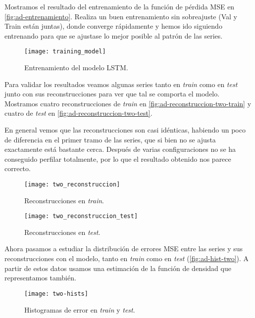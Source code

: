 Mostramos el resultado del entrenamiento de la función de pérdida MSE en \autoref{fig:ad-entrenamiento}. Realiza un buen entrenamiento sin sobreajuste (Val y Train están juntas), donde converge rápidamente y hemos ido siguiendo entrenando para que se ajustase lo mejor posible al patrón de las series.

\begin{figure}[htpb]
  \centering
  \texttt{[image: training\_model]}
  \caption{Entrenamiento del modelo LSTM.}
  \label{fig:ad-entrenamiento}
\end{figure}

Para validar los resultados veamos algunas series tanto en \emph{train} como en \emph{test} junto con sus reconstrucciones para ver que tal se comporta el modelo.
Mostramos cuatro reconstrucciones de \emph{train} en \autoref{fig:ad-reconstruccion-two-train} y cuatro de \emph{test} en \autoref{fig:ad-reconstruccion-two-test}.

En general vemos que las reconstrucciones son casi idénticas, habiendo un poco de diferencia en el primer tramo de las series, que si bien no se ajusta exactamente está bastante cerca. Después de varias configuraciones no se ha conseguido perfilar totalmente, por lo que el resultado obtenido nos parece correcto.

\begin{figure}[htpb]
  \centering
  \texttt{[image: two\_reconstruccion]}
  \caption{Reconstrucciones en \emph{train}.}
  \label{fig:ad-reconstruccion-two-train}
\end{figure}

\begin{figure}[htpb]
  \centering
  \texttt{[image: two\_reconstruccion\_test]}
  \caption{Reconstrucciones en \emph{test}.}
  \label{fig:ad-reconstruccion-two-test}
\end{figure}

Ahora pasamos a estudiar la distribución de errores MSE entre las series y sus reconstrucciones con el modelo, tanto en \emph{train} como en \emph{test} (\autoref{fig:ad-hist-two}). A partir de estos datos usamos una estimación de la función de densidad que representamos también.

\begin{figure}[htpb]
  \centering
  \texttt{[image: two-hists]}
  \caption{Histogramas de error en \emph{train} y \emph{test}.}
  \label{fig:ad-hist-two}
\end{figure}

